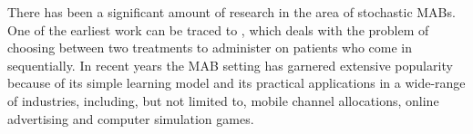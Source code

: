 There has been a significant amount of research in the area of stochastic MABs. One of the earliest work can be traced to \cite{thompson1933likelihood}, which deals with  the problem of choosing between two treatments to administer on patients who come in sequentially. In recent years the MAB setting has garnered extensive popularity because of its simple learning  model and its practical applications in a wide-range of industries, including, but not limited to, mobile channel allocations, online advertising and computer simulation games. 
	
